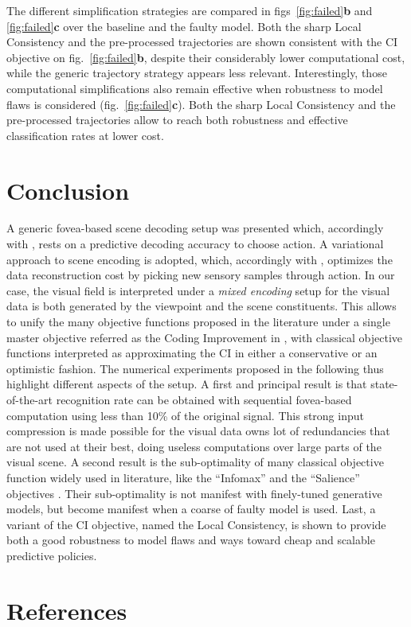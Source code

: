 \documentclass{article}
\begin{document}
The different simplification strategies are compared in figs~\ref{fig:failed}\textbf{b} and \ref{fig:failed}\textbf{c} over the baseline and the faulty model. Both the sharp Local Consistency and the pre-processed trajectories are shown consistent with the CI objective on fig.~\ref{fig:failed}\textbf{b}, despite their considerably lower computational cost, while the generic trajectory strategy appears less relevant. Interestingly, those computational simplifications also remain effective when robustness to model flaws is considered (fig.~\ref{fig:failed}\textbf{c}). 
Both the sharp Local Consistency and the pre-processed trajectories allow to reach both robustness and effective classification rates at lower cost.

\section{Conclusion}
A generic fovea-based scene decoding setup was presented which, accordingly with \cite{najemnik2005optimal}, rests on a predictive decoding accuracy to choose action. A variational approach to scene encoding is adopted, which, accordingly with \cite{friston2012perceptions}, optimizes the data reconstruction cost by picking new sensory samples through action. In our case, the visual field is interpreted under a \emph{mixed encoding} setup for the visual data is both generated by the viewpoint and the scene constituents. 
This allows to unify the many objective functions proposed in the literature under a single master objective referred as the Coding Improvement in \cite{schmidhuber2007simple}, with classical objective functions interpreted as 
approximating the CI in either a conservative or an optimistic fashion. The numerical experiments proposed in the following thus highlight different aspects of the setup. 
A first and principal result is that state-of-the-art recognition rate can be obtained with sequential fovea-based computation using less than 10\% of the original signal. This strong input compression is made possible for the visual data owns lot of redundancies that are not used at their best, doing useless computations over large parts of the visual scene. A second result is the sub-optimality of many classical objective function widely used in literature, like the ``Infomax'' \citep{butko2010infomax} and the ``Salience'' objectives \citep{itti2005bayesian}. Their sub-optimality is not manifest with finely-tuned generative models, but become manifest when a coarse of faulty model is used.  
Last, a variant of the CI objective, named the Local Consistency, is shown to provide both a good robustness to model flaws and ways toward cheap and scalable predictive policies.  


\section*{References}


\end{document}
